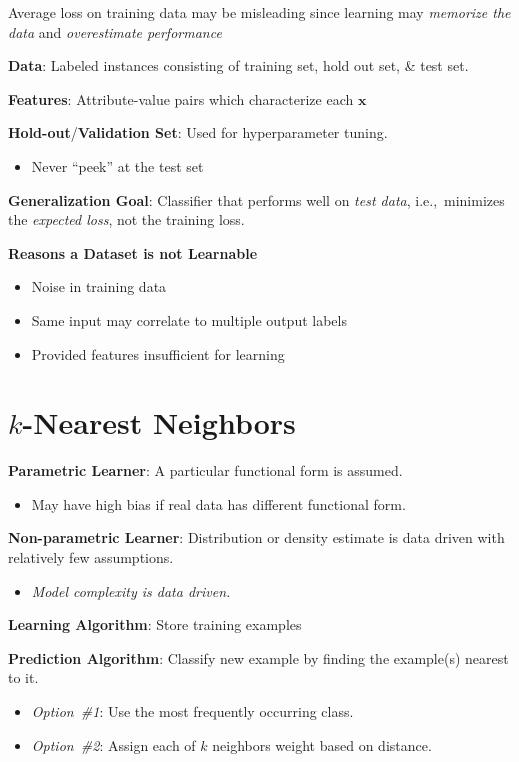 \documentclass[10pt]{article}
\begin{document}
\begin{multicols}{3}
  Average loss on training data may be misleading since learning may \textit{memorize the data} and \textit{overestimate performance}

  \textbf{Data}: Labeled instances consisting of training set, hold out set, \& test set.

  \textbf{Features}: Attribute-value pairs which characterize each $\mathbf{x}$

  \textbf{Hold-out}/\textbf{Validation Set}: Used for hyperparameter tuning.
  \begin{itemize}
    \item Never ``peek'' at the test set
  \end{itemize}

  \textbf{Generalization Goal}: Classifier that performs well on \textit{test data}, i.e.,~minimizes the \textit{expected loss}, not the training loss.

  \textbf{Reasons a Dataset is not Learnable}
  \begin{itemize}
    \item Noise in training data
    \item Same input may correlate to multiple output labels
    \item Provided features insufficient for learning
  \end{itemize}

  \section{$k$-Nearest Neighbors}

  \textbf{Parametric Learner}: A particular functional form is assumed.
  \begin{itemize}
    \item May have high bias if real data has different functional form.
  \end{itemize}

  \textbf{Non-parametric Learner}: Distribution or density estimate is data driven with relatively few assumptions.
  \begin{itemize}
    \item \textit{Model complexity is data driven.}
  \end{itemize}

  \textbf{Learning Algorithm}: Store training examples

  \textbf{Prediction Algorithm}: Classify new example by finding the example(s) nearest to it.
  \begin{itemize}
    \item \textit{Option~\#1}: Use the most frequently occurring class.
    \item \textit{Option~\#2}: Assign each of $k$ neighbors weight based on distance.
  \end{itemize}


\end{multicols}
\end{document}
